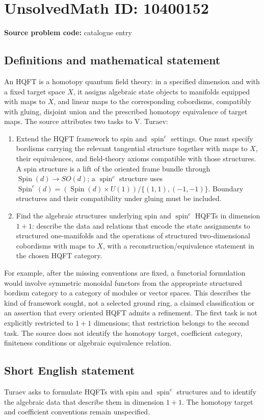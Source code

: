 \documentclass[11pt]{article}
\begin{document}
\section*{UnsolvedMath ID: 10400152}
\textbf{Source problem code:} catalogue entry
\subsection{Definitions and mathematical statement}
An HQFT is a homotopy quantum field theory: in a specified dimension and with a fixed target space \(X\), it assigns algebraic state objects to manifolds equipped with maps to \(X\), and linear maps to the corresponding cobordisms, compatibly with gluing, disjoint union and the prescribed homotopy equivalence of target maps. The source attributes two tasks to V. Turaev:
\begin{enumerate}
\item Extend the HQFT framework to spin and \(\operatorname{spin}^c\) settings. One must specify bordisms carrying the relevant tangential structure together with maps to \(X\), their equivalences, and field-theory axioms compatible with those structures. A spin structure is a lift of the oriented frame bundle through \(\operatorname{Spin}(d)\to SO(d)\); a \(\operatorname{spin}^c\) structure uses \(\operatorname{Spin}^c(d)=(\operatorname{Spin}(d)\times U(1))/\{(1,1),(-1,-1)\}\). Boundary structures and their compatibility under gluing must be included.
\item Find the algebraic structures underlying spin and \(\operatorname{spin}^c\) HQFTs in dimension \(1+1\): describe the data and relations that encode the state assignments to structured one-manifolds and the operations of structured two-dimensional cobordisms with maps to \(X\), with a reconstruction/equivalence statement in the chosen HQFT category.
\end{enumerate}
For example, after the missing conventions are fixed, a functorial formulation would involve symmetric monoidal functors from the appropriate structured bordism category to a category of modules or vector spaces. This describes the kind of framework sought, not a selected ground ring, a claimed classification or an assertion that every oriented HQFT admits a refinement. The first task is not explicitly restricted to \(1+1\) dimensions; that restriction belongs to the second task. The source does not identify the homotopy target, coefficient category, finiteness conditions or algebraic equivalence relation.
\subsection{Short English statement}
Turaev asks to formulate HQFTs with spin and \(\operatorname{spin}^c\) structures and to identify the algebraic data that describe them in dimension \(1+1\). The homotopy target and coefficient conventions remain unspecified.
\end{document}
